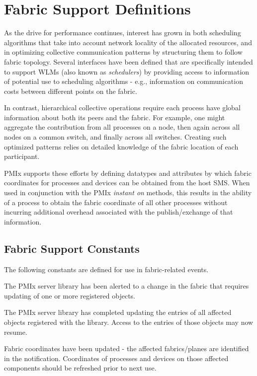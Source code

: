 \chapter{Fabric Support Definitions}
\label{chap:api_fabric}

As the drive for performance continues, interest has grown in both scheduling algorithms that take into account network locality of the allocated resources, and in optimizing collective communication patterns by structuring them to follow fabric topology. Several interfaces have been defined that are specifically intended to support \acp{WLM} (also known as \emph{schedulers}) by providing access to information of potential use to scheduling algorithms - e.g., information on communication costs between different points on the fabric.

In contrast, hierarchical collective operations require each process have global information about both its peers and the fabric. For example, one might aggregate the contribution from all processes on a node, then again across all nodes on a common switch, and finally across all switches. Creating such optimized patterns relies on detailed knowledge of the fabric location of each participant.

\ac{PMIx} supports these efforts by defining datatypes and attributes by which fabric coordinates for processes and devices can be obtained from the host \ac{SMS}. When used in conjunction with the \ac{PMIx} \emph{instant on} methods, this results in the ability of a process to obtain the fabric coordinate of all other processes without incurring additional overhead associated with the publish/exchange of that information.



\section{Fabric Support Constants}
\label{api:sched:consts}

The following constants are defined for use in fabric-related events.

\begin{constantdesc}

%
The \ac{PMIx} server library has been alerted to a change in the fabric that requires updating of one or more registered  objects.

%
The \ac{PMIx} server library has completed updating the entries of all affected  objects registered with the library. Access to the entries of those objects may now resume.

%
Fabric coordinates have been updated - the affected fabrics/planes are identified in the notification. Coordinates of processes and devices on those affected components should be refreshed prior to next use.

\end{constantdesc}

